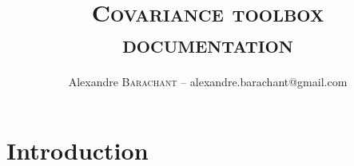 \documentclass[10pt,a4paper,twocolumn]{article}
\author{Alexandre \textsc{Barachant} -- alexandre.barachant@gmail.com}
\title{\textsc{Covariance toolbox documentation}}
\begin{document}
\maketitle
\begin{abstract}

\end{abstract}
\section{Introduction}
\end{document}
